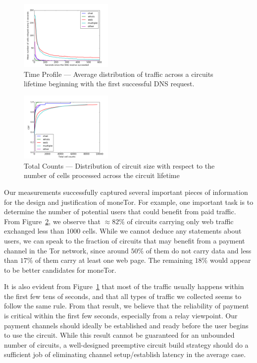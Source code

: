 \begin{figure} \centering
  \includegraphics[width=0.4\textwidth]{images/exitmeasurement.png}
  \caption{Time Profile --- Average distribution of traffic across a circuits
    lifetime beginning with the first successful DNS request.}
  \label{fig:statsa}
\end{figure}
\begin{figure} \centering
  \includegraphics[width=0.4\textwidth]{images/totcellcountscdf.png}
  \caption{Total Counts --- Distribution of circuit size with respect to the
    number of cells processed across the circuit lifetime}
\label{fig:statsb}
\end{figure}


Our measurements successfully captured several important pieces of information
for the design and justification of moneTor. For example, one important task is
to determine the number of potential users that could benefit from paid
traffic. From Figure~\ref{fig:statsb}, we observe that $\approx 82\%$ of
circuits carrying only web traffic exchanged less than 1000 cells. While we
cannot deduce any statements about users, we can speak to the fraction of
circuits that may benefit from a payment channel in the Tor network, since
around $50\%$ of them do not carry data and less than $17\%$ of them carry at
least one web page. The remaining $18\%$ would appear to be better candidates
for moneTor.

It is also evident from Figure~\ref{fig:statsa} that most of the traffic usually
happens within the first few tens of seconds, and that all types of traffic we
collected seems to follow the same rule. From that result, we believe that the
reliability of payment is critical within the first few seconds, especially from
a relay viewpoint. Our payment channels should ideally be established and ready
before the user begins to use the circuit. While this result cannot be
guaranteed for an unbounded number of circuits, a well-designed preemptive
circuit build strategy should do a sufficient job of eliminating channel
setup/establish latency in the average case.

